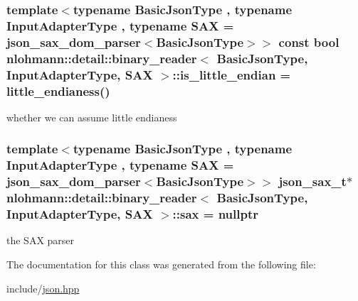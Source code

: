 \subsubsection[{\texorpdfstring{is\+\_\+little\+\_\+endian}{is_little_endian}}]{\setlength{\rightskip}{0pt plus 5cm}template$<$typename Basic\+Json\+Type , typename Input\+Adapter\+Type , typename S\+AX  = json\+\_\+sax\+\_\+dom\+\_\+parser$<$\+Basic\+Json\+Type$>$$>$ const bool {\bf nlohmann\+::detail\+::binary\+\_\+reader}$<$ Basic\+Json\+Type, Input\+Adapter\+Type, S\+AX $>$\+::is\+\_\+little\+\_\+endian = {\bf little\+\_\+endianess}()\hspace{0.3cm}{\ttfamily [private]}}\hypertarget{classnlohmann_1_1detail_1_1binary__reader_ad615eba561e265165a80c95061af75b0}{}\label{classnlohmann_1_1detail_1_1binary__reader_ad615eba561e265165a80c95061af75b0}


whether we can assume little endianess 

\subsubsection[{\texorpdfstring{sax}{sax}}]{\setlength{\rightskip}{0pt plus 5cm}template$<$typename Basic\+Json\+Type , typename Input\+Adapter\+Type , typename S\+AX  = json\+\_\+sax\+\_\+dom\+\_\+parser$<$\+Basic\+Json\+Type$>$$>$ {\bf json\+\_\+sax\+\_\+t}$\ast$ {\bf nlohmann\+::detail\+::binary\+\_\+reader}$<$ Basic\+Json\+Type, Input\+Adapter\+Type, S\+AX $>$\+::sax = nullptr\hspace{0.3cm}{\ttfamily [private]}}\hypertarget{classnlohmann_1_1detail_1_1binary__reader_aba4d89d9d38235f72f60332d6c385222}{}\label{classnlohmann_1_1detail_1_1binary__reader_aba4d89d9d38235f72f60332d6c385222}


the S\+AX parser 



The documentation for this class was generated from the following file\+:\begin{DoxyCompactItemize}
\item 
include/\hyperlink{json_8hpp}{json.\+hpp}\end{DoxyCompactItemize}
